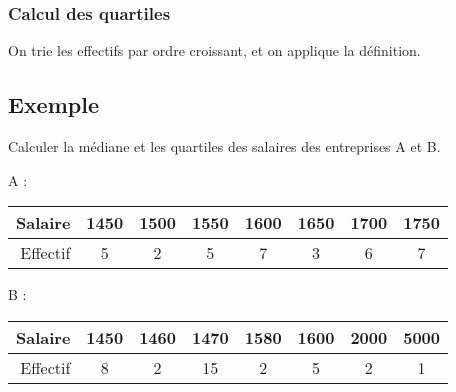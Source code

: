 \documentclass{article}
\begin{document}
\subsubsection*{Calcul des quartiles}

On trie les effectifs par ordre croissant, et on applique la définition.

\subsection*{Exemple}

Calculer la médiane et les quartiles des salaires des entreprises A et B.

  A :
  \begin{tabular}{r|c|c|c|c|c|c|c}
    Salaire  & 1450 & 1500 & 1550 & 1600 & 1650 & 1700 & 1750 \\
    \hline
    Effectif & 5    &  2   &  5   &  7   &  3   &  6   & 7    \\
  \end{tabular}


  B :
  \begin{tabular}{r|c|c|c|c|c|c|c}
    Salaire  & 1450 & 1460 & 1470 & 1580 & 1600 & 2000 & 5000 \\
    \hline
    Effectif & 8    &  2   & 15   &  2   &  5   &  2   & 1    \\
  \end{tabular}

\end{document}
